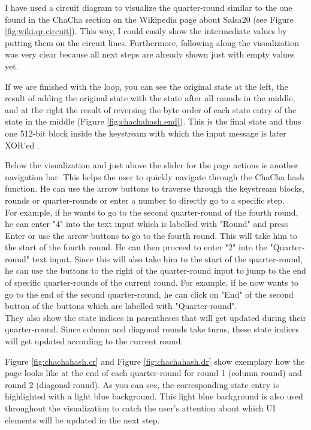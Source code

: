 I have used a circuit diagram to visualize the quarter-round similar to the one found in the ChaCha section on the Wikipedia page about Salsa20 (see Figure \ref{fig:wiki.qr.circuit}). This way, I could easily show the intermediate values by putting them on the circuit lines. Furthermore, following along the visualization was very clear because all next steps are already shown just with empty values yet.

If we are finished with the loop, you can see the original state at the left, the result of adding the original state with the state after all rounds in the middle, and at the right the result of reversing the byte order of each state entry of the state in the middle (Figure \ref{fig:chachahash.end}). This is the final state and thus one 512-bit block inside the keystream with which the input message is later XOR'ed .

Below the visualization and just above the slider for the page actions is another navigation bar. This helps the user to quickly navigate through the ChaCha hash function. He can use the arrow buttons to traverse through the keystream blocks, rounds or quarter-rounds or enter a number to directly go to a specific step. \\
For example, if he wants to go to the second quarter-round of the fourth round, he can enter "4" into the text input which is labelled with "Round" and press Enter or use the arrow buttons to go to the fourth round. This will take him to the start of the fourth round. He can then proceed to enter "2" into the "Quarter-round" text input. Since this will also take him to the start of the quarter-round, he can use the buttons to the right of the quarter-round input to jump to the end of specific quarter-rounds of the current round. For example, if he now wants to go to the end of the second quarter-round, he can click on "End" of the second button of the buttons which are labelled with "Quarter-round". \\
They also show the state indices in parentheses that will get updated during their quarter-round. Since column and diagonal rounds take turns, these state indices will get updated according to the current round.

Figure \ref{fig:chachahash.cr} and Figure \ref{fig:chachahash.dr} show exemplary how the page looks like at the end of each quarter-round for round 1 (column round) and round 2 (diagonal round). As you can see, the corresponding state entry is highlighted with a light blue background. This light blue background is also used throughout the visualization to catch the user's attention about which UI elements will be updated in the next step.\\

